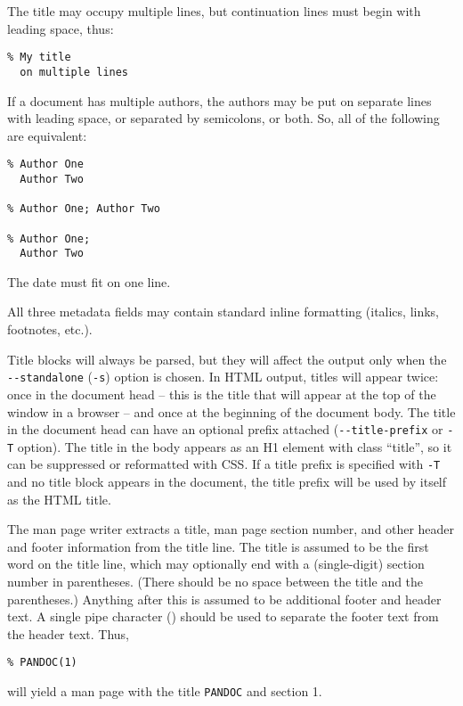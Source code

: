 \documentclass[]{article}
\begin{document}
The title may occupy multiple lines, but continuation lines must begin
with leading space, thus:

\begin{verbatim}
% My title
  on multiple lines
\end{verbatim}

If a document has multiple authors, the authors may be put on separate
lines with leading space, or separated by semicolons, or both. So, all
of the following are equivalent:

\begin{verbatim}
% Author One
  Author Two

% Author One; Author Two

% Author One;
  Author Two
\end{verbatim}

The date must fit on one line.

All three metadata fields may contain standard inline formatting
(italics, links, footnotes, etc.).

Title blocks will always be parsed, but they will affect the output only
when the \texttt{-{}-standalone} (\texttt{-s}) option is chosen. In HTML
output, titles will appear twice: once in the document head -- this is
the title that will appear at the top of the window in a browser -- and
once at the beginning of the document body. The title in the document
head can have an optional prefix attached (\texttt{-{}-title-prefix} or
\texttt{-T} option). The title in the body appears as an H1 element with
class ``title'', so it can be suppressed or reformatted with CSS. If a
title prefix is specified with \texttt{-T} and no title block appears in
the document, the title prefix will be used by itself as the HTML title.

The man page writer extracts a title, man page section number, and other
header and footer information from the title line. The title is assumed
to be the first word on the title line, which may optionally end with a
(single-digit) section number in parentheses. (There should be no space
between the title and the parentheses.) Anything after this is assumed
to be additional footer and header text. A single pipe character
(\texttt{\textbar{}}) should be used to separate the footer text from
the header text. Thus,

\begin{verbatim}
% PANDOC(1)
\end{verbatim}

will yield a man page with the title \texttt{PANDOC} and section 1.
\end{document}

